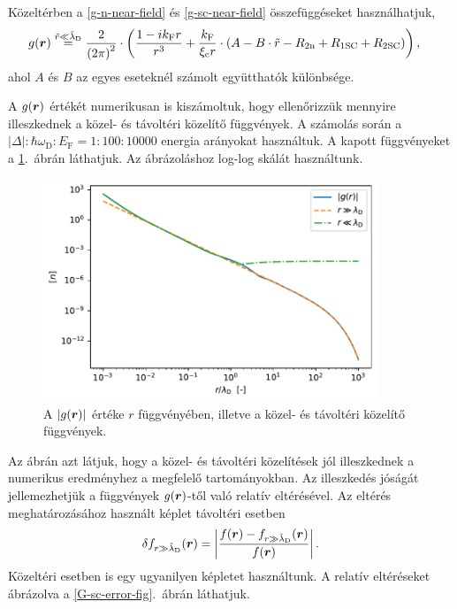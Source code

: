 \documentclass[a4paper,12pt,titlepage]{article}
\newcommand{\RR}{{\vb*{r}}}
\newcommand{\kF}{{k_\text{F}}}
\newcommand{\EF}{{E_\text{F}}}
\begin{document}
Közeltérben a \eqref{g-n-near-field} és \eqref{g-sc-near-field} összefüggéseket használhatjuk,
\begin{equation}
\begin{split}
	g(\RR) & \stackrel{\tilde{r} \ll \tilde{\lambda}_\text{D}}{=} \frac{2}{\left( 2 \pi \right)^2} \cdot \left( \frac{1 - i \kF r}{r^3} + \frac{\kF}{\xi_\text{c} r} \cdot \left( A - B \cdot \tilde{r} - R_{2 \text{n}} + R_{1 \text{SC}} + R_{2 \text{SC}} \right) \right),
\end{split}
\end{equation}
ahol $A$ és $B$ az egyes eseteknél számolt együtthatók különbsége.

A $g(\RR)$ értékét numerikusan is kiszámoltuk, hogy ellenőrizzük mennyire illeszkednek a közel- és távoltéri közelítő függvények.  A számolás során a $\left| \Delta \right| : \hbar \omega_\text{D} : \EF = 1 : 100 : 10000$ energia arányokat használtuk.  A kapott függvényeket a \ref{G-sc-fig}.\ ábrán láthatjuk.  Az ábrázoláshoz log-log skálát használtunk.
\begin{figure}[h!]
	\centering
	\includegraphics[width=10cm]{G_sc.pdf}
	\caption{A $\left| g(\RR) \right|$ értéke $r$ függvényében, illetve a közel- és távoltéri közelítő függvények.}
	\label{G-sc-fig}
\end{figure}

Az ábrán azt látjuk, hogy a közel- és távoltéri közelítések jól illeszkednek a numerikus eredményhez a megfelelő tartományokban.  Az illeszkedés jóságát jellemezhetjük a függvények $g(\RR)$-től való relatív eltérésével.  Az eltérés meghatározásához használt képlet távoltéri esetben
$$ \delta f_{r \gg \tilde{\lambda}_\text{D}}(\RR) = \left| \frac{f(\RR) - f_{r \gg \tilde{\lambda}_\text{D}}(\RR)}{f(\RR)} \right|. $$
Közeltéri esetben is egy ugyanilyen képletet használtunk.  A relatív eltéréseket ábrázolva a \ref{G-sc-error-fig}.\ ábrán láthatjuk.
\end{document}
